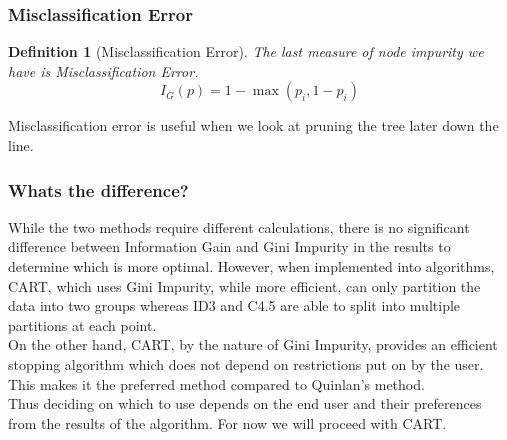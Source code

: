 \documentclass[11pt,a4paper]{report}
\newtheorem{definition}{Definition}
\begin{document}
\subsubsection{Misclassification Error}

\begin{definition}[Misclassification Error]
The last measure of node impurity we have is Misclassification Error.
\begin{equation}
    I_G (p) = 1 - \max (p_i, 1 - p_i)
\end{equation}
\end{definition}
Misclassification error is useful when we look at pruning the tree later down the line.




\subsubsection{Whats the difference?}
While the two methods require different calculations, there is no significant difference between Information Gain and Gini Impurity in the results to determine which is more optimal. 
However, when implemented into algorithms, CART, which uses Gini Impurity, while more efficient, can only partition the data into two groups whereas ID3 and C4.5 are able to split into multiple partitions at each point.\\
On the other hand, CART, by the nature of Gini Impurity, provides an efficient stopping algorithm which does not depend on restrictions put on by the user. This makes it the preferred method compared to Quinlan's method.\\
Thus deciding on which to use depends on the end user and their preferences from the results of the algorithm. For now we will proceed with CART.
\end{document}
